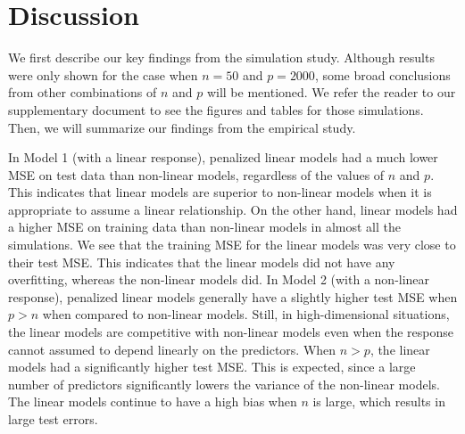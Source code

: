 \documentclass{article}
\begin{document}

	
	\newpage
	\section{Discussion}\label{sec:discussion}
	
	We first describe our key findings from the simulation study. Although results were only shown for the case when $n = 50$ and $p = 2000$, some broad conclusions from other combinations of $n$ and $p$ will be mentioned. We refer the reader to our supplementary document to see the figures and tables for those simulations. Then, we will summarize our findings from the empirical study.
	
	In Model 1 (with a linear response), penalized linear models had a much lower MSE on test data than non-linear models, regardless of the values of $n$ and $p$. This indicates that linear models are superior to non-linear models when it is appropriate to assume a linear relationship. On the other hand, linear models had a higher MSE on training data than non-linear models in almost all the simulations. We see that the training MSE for the linear models was very close to their test MSE. This indicates that the linear models did not have any overfitting, whereas the non-linear models did. In Model 2 (with a non-linear response), penalized linear models generally have a slightly higher test MSE when $p > n$ when compared to non-linear models. Still, in high-dimensional situations, the linear models are competitive with non-linear models even when the response cannot assumed to depend linearly on the predictors. When $n > p$, the linear models had a significantly higher test MSE. This is expected, since a large number of predictors significantly lowers the variance of the non-linear models. The linear models continue to have a high bias when $n$ is large, which results in large test errors.
	
\end{document}
